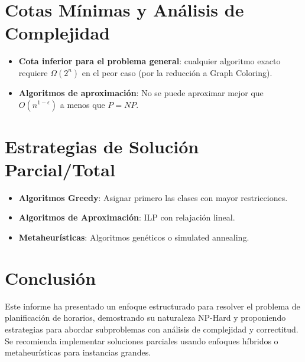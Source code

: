 \documentclass[12pt, a4paper]{article}
\begin{document}
\section{Cotas Mínimas y Análisis de Complejidad}
\begin{itemize}
    \item \textbf{Cota inferior para el problema general}: cualquier algoritmo exacto requiere \( \Omega(2^n) \) en el peor caso (por la reducción a Graph Coloring).
    \item \textbf{Algoritmos de aproximación}: No se puede aproximar mejor que \( O(n^{1-\epsilon}) \) a menos que \( P = NP \).
\end{itemize}

\section{Estrategias de Solución Parcial/Total}
\begin{itemize}
    \item \textbf{Algoritmos Greedy}: Asignar primero las clases con mayor restricciones.
    \item \textbf{Algoritmos de Aproximación}: ILP con relajación lineal.
    \item \textbf{Metaheurísticas}: Algoritmos genéticos o simulated annealing.
\end{itemize}

\section{Conclusión}
Este informe ha presentado un enfoque estructurado para resolver el problema de planificación de horarios, demostrando su naturaleza NP-Hard y proponiendo estrategias para abordar subproblemas con análisis de complejidad y correctitud. Se recomienda implementar soluciones parciales usando enfoques híbridos o metaheurísticas para instancias grandes.
\end{document}
